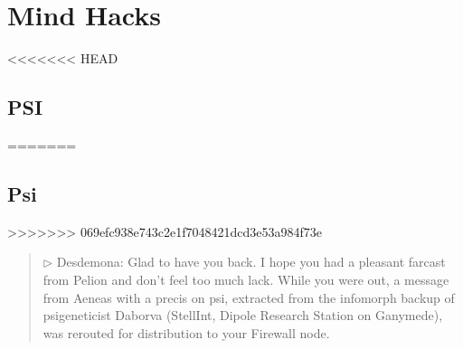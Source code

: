 \chapter{Mind Hacks}
\label{cha:mind-hacks}


<<<<<<< HEAD
\section{PSI}
=======
\section{Psi}
>>>>>>> 069efc938e743c2e1f7048421dcd3e53a984f73e

\begin{quotation}

$\triangleright $ Desdemona: Glad to have you back. I hope
you had a pleasant farcast from Pelion and don’t
feel too much lack. While you were out, a message
from Aeneas with a precis on psi, extracted from
the infomorph backup of psigeneticist Daborva
(StellInt, Dipole Research Station on Ganymede),
was rerouted for distribution to your Firewall node.
\end{quotation}

